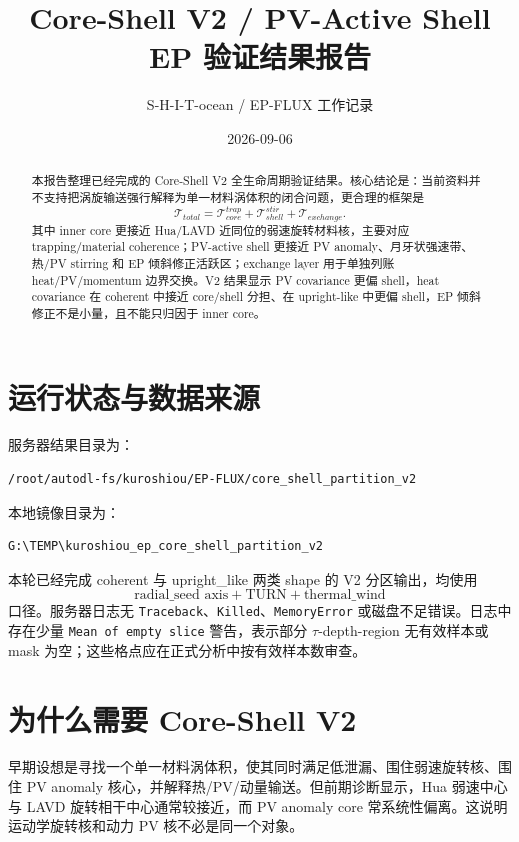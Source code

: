 \documentclass[UTF8,12pt]{ctexart}
\title{\textbf{Core-Shell V2 / PV-Active Shell\\EP 验证结果报告}}
\author{S-H-I-T-ocean / EP-FLUX 工作记录}
\date{2026-09-06}
\begin{document}
\maketitle

\begin{abstract}
本报告整理已经完成的 Core-Shell V2 全生命周期验证结果。核心结论是：当前资料并不支持把涡旋输送强行解释为单一材料涡体积的闭合问题，更合理的框架是
\[
\mathcal{T}_{total}
=
\mathcal{T}_{core}^{trap}
+
\mathcal{T}_{shell}^{stir}
+
\mathcal{T}_{exchange}.
\]
其中 inner core 更接近 Hua/LAVD 近同位的弱速旋转材料核，主要对应 trapping/material coherence；PV-active shell 更接近 PV anomaly、月牙状强速带、热/PV stirring 和 EP 倾斜修正活跃区；exchange layer 用于单独列账 heat/PV/momentum 边界交换。V2 结果显示 PV covariance 更偏 shell，heat covariance 在 coherent 中接近 core/shell 分担、在 upright-like 中更偏 shell，EP 倾斜修正不是小量，且不能只归因于 inner core。
\end{abstract}

\section{运行状态与数据来源}

服务器结果目录为：
\begin{verbatim}
/root/autodl-fs/kuroshiou/EP-FLUX/core_shell_partition_v2
\end{verbatim}
本地镜像目录为：
\begin{verbatim}
G:\TEMP\kuroshiou_ep_core_shell_partition_v2
\end{verbatim}

本轮已经完成 coherent 与 upright\_like 两类 shape 的 V2 分区输出，均使用
\[
\text{radial\_seed axis}+\text{TURN}+\text{thermal\_wind}
\]
口径。服务器日志无 \texttt{Traceback}、\texttt{Killed}、\texttt{MemoryError} 或磁盘不足错误。日志中存在少量 \texttt{Mean of empty slice} 警告，表示部分 \(\tau\)-depth-region 无有效样本或 mask 为空；这些格点应在正式分析中按有效样本数审查。

\section{为什么需要 Core-Shell V2}

早期设想是寻找一个单一材料涡体积，使其同时满足低泄漏、围住弱速旋转核、围住 PV anomaly 核心，并解释热/PV/动量输送。但前期诊断显示，Hua 弱速中心与 LAVD 旋转相干中心通常较接近，而 PV anomaly core 常系统性偏离。这说明运动学旋转核和动力 PV 核不必是同一个对象。
\end{document}
